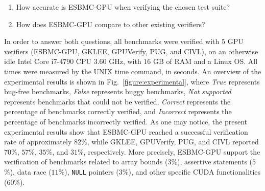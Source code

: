 \documentclass{llncs}
\begin{document}


\begin{enumerate}

\item How accurate is ESBMC-GPU when verifying the chosen test suite?


\item How does ESBMC-GPU compare to other existing verifiers?


\end{enumerate}

\noindent In order to answer both questions, all benchmarks were verified with $5$ GPU verifiers (ESBMC-GPU, GKLEE, GPUVerify, PUG, and CIVL), on an otherwise idle Intel Core i$7$-$4790$ CPU $3$.$60$ GHz, with $16$ GB of RAM and a Linux OS. All times were measured by the UNIX time command, in seconds. An overview of the experimental results is shown in Fig.~\ref{figure:experimental}, where {\it True} represents bug-free benchmarks, {\it False} represents buggy benchmarks, {\it Not supported} represents benchmarks that could not be verified, {\it Correct} represents the percentage of benchmarks correctly verified, and {\it Incorrect} represents the percentage of benchmarks incorrectly verified. As one may notice, the present experimental results show that ESBMC-GPU reached a successful verification rate of approximately $82\%$, while GKLEE, GPUVerify, PUG, and CIVL reported $70\%$, $57\%$, $35\%$, and $31\%$, respectively. More precisely, ESBMC-GPU support the verification of benchmarks related to array bounds ($3$\%), assertive statements ($5$\%), data race ($11$\%), {\tt NULL} pointers ($3$\%), and other specific CUDA functionalities ($60$\%).
\end{document}
